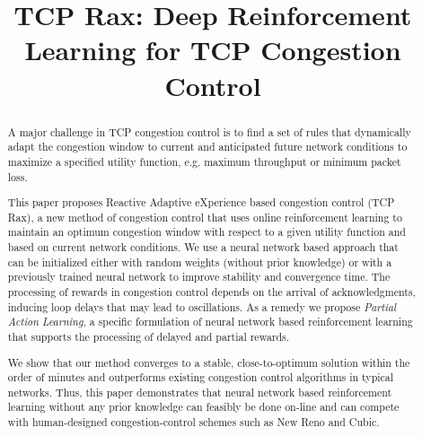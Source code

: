\documentclass[newfonts=false,format=sigconf,10pt,letterpaper]{acmart}
\begin{document}
\title{TCP Rax: Deep Reinforcement Learning for TCP Congestion Control}

%
%


\begin{abstract}

A major challenge in TCP congestion control is to find a set of rules that dynamically adapt the congestion window to current and anticipated future network conditions to maximize a specified utility function, e.g. maximum throughput or minimum packet loss. 

This paper proposes Reactive Adaptive eXperience based congestion control (TCP Rax), a new method of congestion control that uses online reinforcement learning to maintain an optimum congestion window with respect to a given utility function and based on current network conditions. We use a neural network based approach that can be initialized either with random weights (without prior knowledge) or with a previously trained neural network to improve stability and convergence time. The processing of rewards in congestion control depends on the arrival of acknowledgments, inducing loop delays that may lead to oscillations. As a remedy we propose \textit{Partial Action Learning}, a specific formulation of neural network based reinforcement learning that supports the processing of delayed and partial rewards. 

We show that our method converges to a stable, close-to-optimum solution within the order of minutes and outperforms existing congestion control algorithms in typical networks. Thus, this paper demonstrates that neural network based reinforcement learning without any prior knowledge can feasibly be done on-line and can compete with human-designed congestion-control schemes such as New Reno and Cubic.

\end{abstract}
\end{document}
